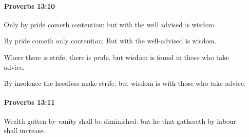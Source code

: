 		\paragraph{Proverbs 13:10} %
			\label{PROVERBS-13-10}

			Only by pride cometh contention: but with the well advised is wisdom.

			\begin{versebox}
					\item[BHS] 
					\item[ASV] By pride cometh only contention; But with the well-advised is wisdom.
					\item[NIV] Where there is strife, there is pride, but wisdom is found in those who take advice.
					\item[NRSV] By insolence the heedless make strife, but wisdom is with those who take advice.
			\end{versebox}

		\paragraph{Proverbs 13:11} %
			\label{PROVERBS-13-11}

			Wealth gotten by vanity shall be diminished: but he that gathereth by labour shall increase.

